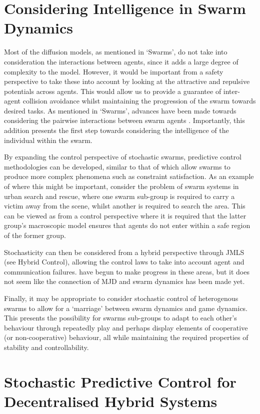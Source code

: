 \documentclass[../sample.tex]{subfiles}
\begin{document}
\section{Considering Intelligence in Swarm Dynamics}

Most of the diffusion models, as mentioned in ‘Swarms’, do not take into consideration the
interactions between agents, since it adds a large degree of complexity to the model. However, it
would be important from a safety perspective to take these into account by looking at the attractive
and repulsive potentials across agents. This would allow us to provide a guarantee of inter-agent
collision avoidance whilst maintaining the progression of the swarm towards desired tasks. As
mentioned in ‘Swarms’, advances have been made towards considering the pairwise interactions between
swarm agents \cite{Bellomo2017}. Importantly, this addition presents the first step towards
considering the intelligence of the individual within the swarm.

By expanding the control perspective of stochastic swarms, predictive control methodologies can be
developed, similar to that of \cite{Borzi2015} which allow swarms to produce more complex phenomena
such as constraint satisfaction. As an example of where this might be important, consider the
problem of swarm systems in urban search and rescue, where one swarm sub-group is required to carry
a victim away from the scene, whilst another is required to search the area. This can be viewed as
from a control perspective where it is required that the latter group’s macroscopic model ensures
that agents do not enter within a safe region of the former group. 

Stochasticity can then be considered from a hybrid perspective through JMLS (see Hybrid Control),
allowing the control laws to take into account agent and communication failures.
\cite{FUHRMANFrancescoRUSSO,Ma2017,Li2017} have begun to make progress in these areas, but it does
not seem like the connection of MJD and swarm dynamics has been made yet. 

Finally, it may be appropriate to consider stochastic control of heterogenous swarms to allow for a
‘marriage’ between swarm dynamics and game dynamics. This presents the possibility for swarms
sub-groups to adapt to each other’s behaviour through repeatedly play and perhaps display elements
of cooperative (or non-cooperative) behaviour, all while maintaining the required properties of
stability and controllability.

\section{Stochastic Predictive Control for Decentralised Hybrid Systems}
\end{document}
